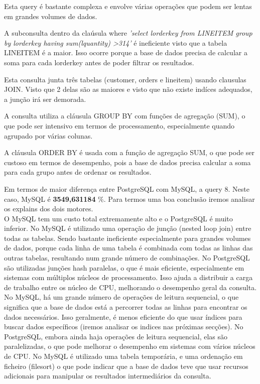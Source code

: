 \documentclass{article}
\begin{document}
Esta query é bastante complexa e envolve várias operações que podem ser lentas em grandes volumes de dados.

A subconsulta dentro da claúsula where \textit{'select l\underline{}orderkey from LINEITEM group by l\underline{}orderkey having sum(l\underline{}quantity) \textgreater 314'} é ineficiente visto que a tabela LINEITEM é a maior. Isso ocorre porque a base de dados precisa de calcular a soma para cada l\underline{}orderkey antes de poder filtrar os resultados.

Esta consulta junta três tabelas (customer, orders e lineitem) usando clausulas JOIN. Visto que 2 delas são as maiores e visto que não existe indíces adequados, a junção irá ser demorada. 

 A consulta utiliza a cláusula GROUP BY com funções de agregação (SUM), o que pode ser intensivo em termos de processamento, especialmente quando agrupado por várias colunas.

A cláusula ORDER BY é usada com a função de agregação SUM, o que pode ser custoso em termos de desempenho, pois a base de dados precisa calcular a soma para cada grupo antes de ordenar os resultados.


Em termos de maior diferença entre PostgreSQL com MySQL, a query 8. Neste caso, MySQL é \textbf{3549,631184} \%.  Para termos uma boa conclusão iremos analisar os explains dos dois motores.\\

O MySQL tem um custo total extremamente alto e o PostgreSQL é muito inferior.
No MySQL é utilizado uma operação de junção (nested loop join) entre todas as tabelas. Sendo bastante ineficiente especialmente para grandes volumes de dados, porque cada linha de uma tabela é combinada com todas as linhas das outras tabelas, resultando num grande número de combinações.
No PostgreSQL são utilizadas junções hash paralelas, o que é mais eficiente, especialmente em sistemas com múltiplos núcleos de processamento. Isso ajuda a distribuir a carga de trabalho entre os núcleo de CPU, melhorando o desempenho geral da consulta.
No MySQL, há um grande número de operações de leitura sequencial, o que significa que a base de dados está a percorrer todas as linhas para encontrar os dados necessários. Isso geralmente, é menos eficiente do que usar índices para buscar dados específicos (iremos analisar os indices nas próximas secções).
No PostgreSQL, embora ainda haja operações de leitura sequencial, elas são paralelizadas, o que pode melhorar o desempenho em sistemas com vários núcleos de CPU.
No MySQL é utilizado uma tabela temporária, e uma ordenação em ficheiro (filesort) o que pode indicar que a base de dados teve que usar recursos adicionais para manipular os resultados intermediários da consulta.
\end{document}
